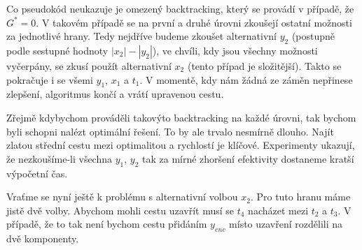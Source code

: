 \documentclass[
  printversion=false,
  joinlists=true,
  glossaries=true,
  figures=true,
  tables=true,
  sourcecodes=false,
  theorems=false,
  bibencoding=utf8,
  language=czech,
  encoding=utf8,
  program=infpvs,
  index=true,
  biblatex=true
]{kidiplom}
\begin{document}
Co pseudokód neukazuje je omezený backtracking, který se provádí v případě, že $G^* = 0$. V takovém případě se na první a druhé úrovni zkoušejí ostatní možnosti za jednotlivé hrany. Tedy nejdříve budeme zkoušet alternativní $y_2$ (postupně podle sestupné hodnoty $|x_2| - |y_2|$), ve chvíli, kdy jsou všechny možnosti vyčerpány, se zkusí použít alternativní $x_2$ (tento případ je složitější). Takto se pokračuje i se všemi $y_1$, $x_1$ a $t_1$. V momentě, kdy nám žádná ze záměn nepřinese zlepšení, algoritmus končí a vrátí upravenou cestu.

\hspace{6.5mm}Zřejmě kdybychom prováděli takovýto backtracking na každé úrovni, tak bychom byli schopni nalézt optimální řešení. To by ale trvalo nesmírně dlouho. Najít zlatou střední cestu mezi optimalitou a rychlostí je klíčové. Experimenty ukazují, že nezkoušíme-li všechna $y_1$, $y_2$ tak za mírné zhoršení efektivity dostaneme kratší výpočetní čas.

\hspace{6.5mm}Vraťme se nyní ještě k problému s alternativní volbou $x_2$. Pro tuto hranu máme jistě dvě volby. Abychom mohli cestu uzavřít musí se $t_4$ nacházet mezi $t_2$ a $t_3$. V případě, že to tak není bychom cestu přidáním $y_{enc}$ místo uzavření rozdělili na dvě komponenty.
\end{document}
